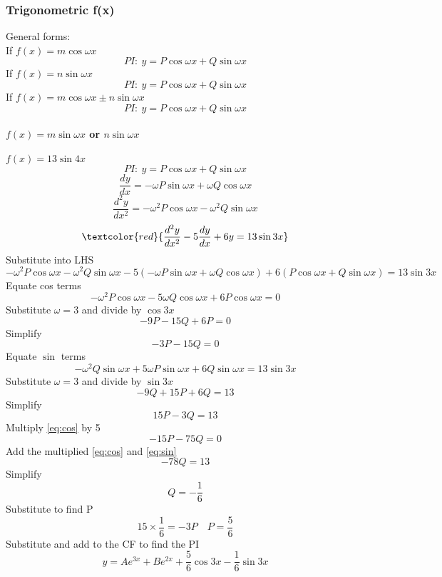 \documentclass{article}[18pt]
\begin{document}
\subsubsection{Trigonometric f(x)}
General forms:\\
If $f(x)=m\cos\omega x$
$$PI: \ y=P\cos\omega x+Q\sin\omega x$$
If $f(x)=n\sin\omega x$
$$PI: \ y=P\cos\omega x+Q\sin\omega x$$
If $f(x)=m\cos\omega x\pm n\sin\omega x$
$$PI: \ y=P\cos\omega x+Q\sin\omega x$$
\paragraph{$f(x)=m\sin\omega x$ or $n\sin\omega x$}
$f(x)=13\sin4x$
$$PI: \ y=P\cos\omega x+Q\sin\omega x$$
$$\frac{dy}{dx}=-\omega P\sin\omega x+\omega Q\cos\omega x$$
$$\frac{d^2y}{dx^2}=-\omega^2P\cos\omega x-\omega^2Q\sin\omega x$$
$$\textcolor{red}{\frac{d^2y}{dx^2}-5\frac{dy}{dx}+6y=13\sin3x}$$
Substitute into LHS
$$-\omega^2P\cos\omega x-\omega^2Q\sin\omega x-5(-\omega P\sin\omega x+\omega Q\cos\omega x)+6(P\cos\omega x+Q\sin\omega x)=13\sin3x$$
Equate cos terms
$$-\omega^2 P\cos\omega x-5\omega Q\cos\omega x+6P\cos\omega x=0$$
Substitute $\omega=3$ and divide by $\cos3x$
$$-9P-15Q+6P=0$$
Simplify
\begin{equation}\label{eq:cos}
-3P-15Q=0
\end{equation}
Equate $\sin$ terms
$$-\omega^2Q\sin\omega x+5\omega P\sin\omega x+6Q\sin\omega x=13\sin3x$$
Substitute $\omega=3$ and divide by $\sin3x$
$$-9Q+15P+6Q=13$$
Simplify
\begin{equation}\label{eq:sin}
15P-3Q=13
\end{equation}
Multiply \eqref{eq:cos} by 5
$$-15P-75Q=0$$
Add the multiplied \eqref{eq:cos} and \eqref{eq:sin}
$$-78Q=13$$
Simplify
$$Q=-\frac{1}{6}$$
Substitute to find P
$$15\times\frac{1}{6}=-3P \quad P=\frac{5}{6}$$
Substitute and add to the CF to find the PI
$$y=Ae^{3x}+Be^{2x}+\frac{5}{6}\cos3x-\frac{1}{6}\sin3x$$
\end{document}
